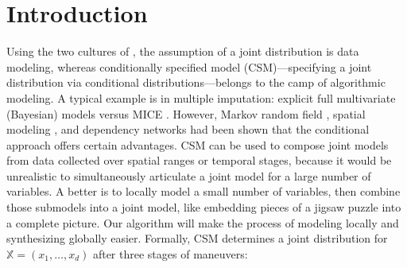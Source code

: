 \documentclass[12pt,a4paper]{article}
\begin{document}
\section{Introduction}
Using the two cultures of \citet{Breiman2001}, the assumption of a joint distribution is  data modeling, whereas conditionally specified model (CSM)---specifying a joint distribution via conditional distributions---belongs to the camp of algorithmic modeling.   %
A typical example is in multiple imputation: explicit full multivariate (Bayesian) models versus MICE \citep[multiple imputation by chained equations,][]{Raghunathan2001,vanBuuren2007}.  However,  Markov random field \citep{Kaiser2000}, spatial modeling \citep{Besag1974}, and dependency networks \citep{Heckerman2000} had been shown that the conditional approach offers certain advantages. CSM can be used to compose joint models from data collected over spatial ranges or temporal stages, because
it would be unrealistic to simultaneously articulate a joint model for  a large number of variables.
A better is to locally model a small number of variables, then combine those submodels into a joint model, like embedding pieces of a jigsaw puzzle into a complete picture.
Our algorithm will make the process of modeling locally and synthesizing  globally easier.
Formally, CSM determines a joint distribution for $\mathbb{X}=(x_1,\ldots,x_d)$ after three stages of maneuvers:
\end{document}
